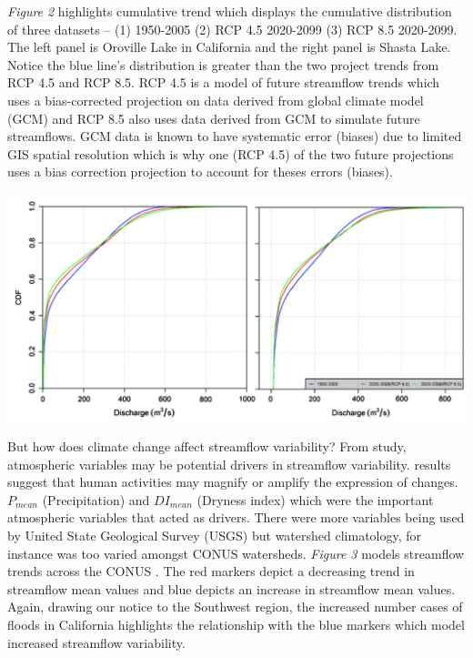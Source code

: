 \documentclass[a4paper,man,biblatex]{apa7}
\begin{document}
\vspace{2ex}
\par \textit{Figure 2} highlights cumulative trend which displays the cumulative distribution of three datasets -- (1) 1950-2005 (2) RCP 4.5 2020-2099 (3) RCP 8.5 2020-2099. The left panel is Oroville Lake in California and the right panel is Shasta Lake. Notice the blue line's distribution is greater than the two project trends from RCP 4.5 and RCP 8.5. RCP 4.5 is a model of future streamflow trends which uses a bias-corrected projection on data derived from global climate model (GCM) and RCP 8.5 also uses data derived from GCM to simulate future streamflows. GCM data is known to have systematic error (biases) due to limited GIS spatial resolution which is why one (RCP 4.5) of the two future projections uses a bias correction projection to account for theses errors (biases).\\
\begin{minipage}{0.65\linewidth}   
    \centering
    \includegraphics[scale=0.40]{cdf_streamflow.png}
\end{minipage}
\vspace{2ex}
\par But how does climate change affect streamflow variability? From \textcite{rice_2016} study, atmospheric variables may be potential drivers in streamflow variability. \textcite{rice_2016} results suggest that human activities may magnify or amplify the expression of changes. $P_\textit{mean}$ (Precipitation) and $DI_\textit{mean}$ (Dryness index) which were the important atmospheric variables that acted as drivers. There were more variables being used by United State Geological Survey (USGS) but watershed climatology, for instance was too varied amongst CONUS watersheds. \textit{Figure 3} models streamflow trends across the CONUS \autocite{rice_2016}. The red markers depict a decreasing trend in streamflow mean values and blue depicts an increase in streamflow mean values. Again, drawing our notice to the Southwest region, the increased number cases of floods in California highlights the relationship with the blue markers which model increased streamflow variability. \\
\end{document}

